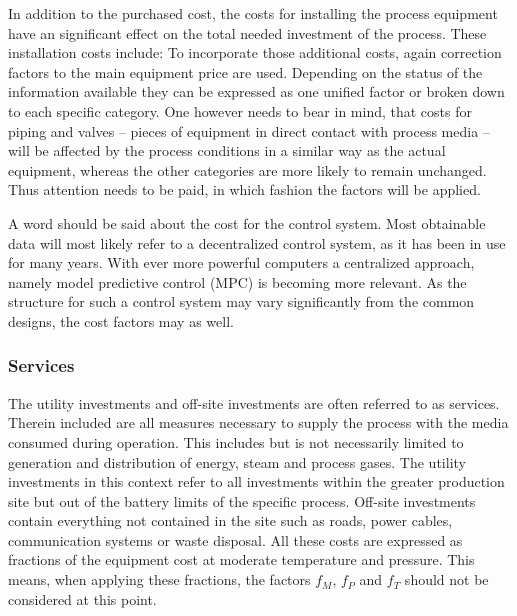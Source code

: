         In addition to the purchased cost, the costs for installing the process equipment have an significant effect
        on the total needed investment of the process. These installation costs include:
        To incorporate those additional costs, again correction factors to the main equipment price are used.
        Depending on the status
        of the information available they can be expressed as one unified factor or broken down to each specific
        category. One however needs to bear in mind, that costs for piping and valves -- pieces of equipment
        in direct contact with process media -- will be affected by the process conditions in a similar
        way as the actual equipment, whereas the other categories are more likely to remain unchanged. Thus
        attention needs to be paid, in which fashion the factors will be applied.

        A word should be said about the cost for the control system. Most obtainable data will most likely refer to
        a decentralized control system, as it has been in use for many years. With ever more powerful computers
        a centralized approach, namely model predictive control (MPC) is becoming more relevant. As the
        structure for such a control system may vary significantly from the common designs, the cost factors may
        as well.

    \subsubsection{Services}
        The utility investments and off-site investments are often referred to as services. Therein included are
        all measures necessary to supply the process with the media consumed during operation. This includes but is
        not necessarily limited to generation and distribution of energy, steam and process gases. The utility investments
        in this context refer to all investments within the greater production site but out of the battery limits of the
        specific process. Off-site investments contain everything not contained in the site such as roads, power cables,
        communication systems or waste disposal. All these costs are expressed as fractions of the equipment
        cost at moderate temperature and pressure. This means, when applying these fractions, the factors $f_M$,
        $f_P$ and $f_T$ should not be considered at this point.

